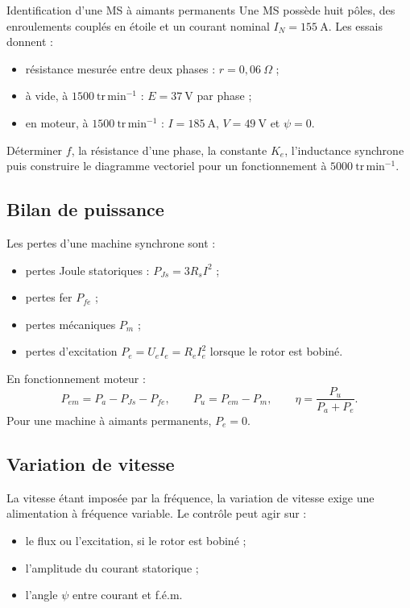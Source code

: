 \begin{TLMachineExercise}{Identification d'une MS à aimants permanents}
Une MS possède huit pôles, des enroulements couplés en étoile et un courant nominal $I_N=155\ \mathrm A$. Les essais donnent :
\begin{itemize}
  \item résistance mesurée entre deux phases : $r=0{,}06\ \Omega$ ;
  \item à vide, à $1500\ \mathrm{tr\,min^{-1}}$ : $E=37\ \mathrm V$ par phase ;
  \item en moteur, à $1500\ \mathrm{tr\,min^{-1}}$ : $I=185\ \mathrm A$, $V=49\ \mathrm V$ et $\psi=0$.
\end{itemize}
Déterminer $f$, la résistance d'une phase, la constante $K_e$, l'inductance synchrone puis construire le diagramme vectoriel pour un fonctionnement à $5000\ \mathrm{tr\,min^{-1}}$.
\end{TLMachineExercise}

\subsection{Bilan de puissance}

Les pertes d'une machine synchrone sont :
\begin{itemize}
  \item pertes Joule statoriques : $P_{Js}=3R_sI^2$ ;
  \item pertes fer $P_{fe}$ ;
  \item pertes mécaniques $P_m$ ;
  \item pertes d'excitation $P_e=U_eI_e=R_eI_e^2$ lorsque le rotor est bobiné.
\end{itemize}

\begin{center}\TLBilanPuissanceMS\end{center}

En fonctionnement moteur :
\[
P_{em}=P_a-P_{Js}-P_{fe},
\qquad
P_u=P_{em}-P_m,
\qquad
\boxed{\eta=\frac{P_u}{P_a+P_e}.}
\]
Pour une machine à aimants permanents, $P_e=0$.

\subsection{Variation de vitesse}

La vitesse étant imposée par la fréquence, la variation de vitesse exige une alimentation à fréquence variable. Le contrôle peut agir sur :
\begin{itemize}
  \item le flux ou l'excitation, si le rotor est bobiné ;
  \item l'amplitude du courant statorique ;
  \item l'angle $\psi$ entre courant et f.é.m.
\end{itemize}

